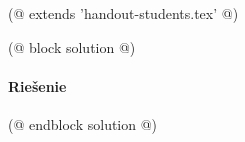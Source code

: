 (@ extends 'handout-students.tex' @)

(@ block solution @)
    \paragraph{Riešenie}
(@ endblock solution @)

